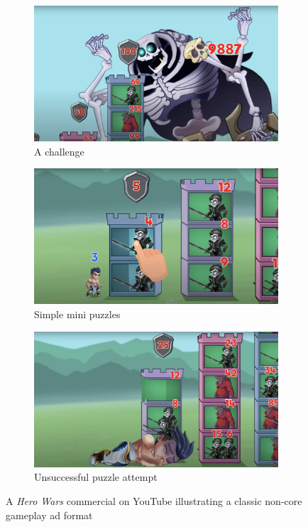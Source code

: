\documentclass[a4paper, 12pt, mla]{homework}
\begin{document}
\begin{figure}[bt]\centering
	\begin{subfigure}[t]{0.3\linewidth}\centering
		\includegraphics[width=\linewidth]{HW-Drama.png}
		\caption{A challenge}
		\label{FIG:HW-Drama}
	\end{subfigure}
	\begin{subfigure}[t]{0.3\linewidth}\centering
		\includegraphics[width=\linewidth]{HW-Puzzle.png}
		\caption{Simple mini puzzles}
		\label{FIG:HW-Puzzle}
	\end{subfigure}
	\begin{subfigure}[t]{0.3\linewidth}\centering
		\includegraphics[width=\linewidth]{HW-Fail.png}
		\caption{Unsuccessful puzzle attempt}
		\label{FIG:HW-Fail}
	\end{subfigure}
	\captionsetup{width=0.92\linewidth}
	\caption{A \textit{Hero Wars} commercial on YouTube illustrating a classic non-core gameplay ad format \protect\cite{DG:HeroWars, YT:HeroWars-Legend}}
	\label{FIG:HW}
\end{figure}
\end{document}
